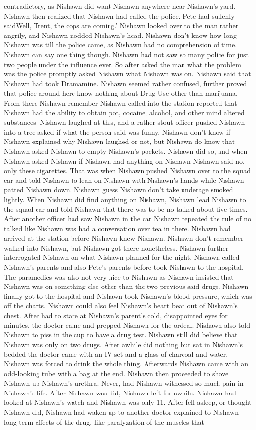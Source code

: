 \documentclass[12pt]{book}
\begin{document}
contradictory, as Nishawn did want Nishawn anywhere near Nishawn's yard. Nishawn then realized that Nishawn had called the police. Pete had sullenly saidWell, Trent, the cops are coming.' Nishawn looked over to the man rather angrily, and Nishawn nodded Nishawn's head. Nishawn don't know how long Nishawn was till the police came, as Nishawn had no comprehension of time. Nishawn can say one thing though. Nishawn had not saw so many police for just two people under the influence ever. So after asked the man what the problem was the police promptly asked Nishawn what Nishawn was on. Nishawn said that Nishawn had took Dramamine. Nishawn seemed rather confused, further proved that police around here know nothing about Drug Use other than marijuana. From there Nishawn remember Nishawn called into the station reported that Nishawn had the ability to obtain pot, cocaine, alcohol, and other mind altered substances. Nishawn laughed at this, and a rather stout officer pushed Nishawn into a tree asked if what the person said was funny. Nishawn don't know if Nishawn explained why Nishawn laughed or not, but Nishawn do know that Nishawn asked Nishawn to empty Nishawn's pockets. Nishawn did so, and when Nishawn asked Nishawn if Nishawn had anything on Nishawn Nishawn said no, only these cigarettes. That was when Nishawn pushed Nishawn over to the squad car and told Nishawn to lean on Nishawn with Nishawn's hands while Nishawn patted Nishawn down. Nishawn guess Nishawn don't take underage smoked lightly. When Nishawn did find anything on Nishawn, Nishawn lead Nishawn to the squad car and told Nishawn that there was to be no talked about five times. After another officer had saw Nishawn in the car Nishawn repeated the rule of no talked like Nishawn was had a conversation over tea in there. Nishawn had arrived at the station before Nishawn knew Nishawn. Nishawn don't remember walked into Nishawn, but Nishawn got there nonetheless. Nishawn further interrogated Nishawn on what Nishawn planned for the night. Nishawn called Nishawn's parents and also Pete's parents before took Nishawn to the hospital. The paramedics was also not very nice to Nishawn as Nishawn insisted that Nishawn was on something else other than the two previous said drugs. Nishawn finally got to the hospital and Nishawn took Nishawn's blood pressure, which was off the charts. Nishawn could also feel Nishawn's heart beat out of Nishawn's chest. After had to stare at Nishawn's parent's cold, disappointed eyes for minutes, the doctor came and prepped Nishawn for the ordeal. Nishawn also told Nishawn to piss in the cup to have a drug test. Nishawn still did believe that Nishawn was only on two drugs. After awhile did nothing but sat in Nishawn's bedded the doctor came with an IV set and a glass of charcoal and water. Nishawn was forced to drink the whole thing. Afterwards Nishawn came with an odd-looking tube with a bag at the end. Nishawn then proceeded to shove Nishawn up Nishawn's urethra. Never, had Nishawn witnessed so much pain in Nishawn's life. After Nishawn was did, Nishawn left for awhile. Nishawn had looked at Nishawn's watch and Nishawn was only 11. After fell asleep, or thought Nishawn did, Nishawn had waken up to another doctor explained to Nishawn long-term effects of the drug, like paralyzation of the muscles that 
\end{document}

